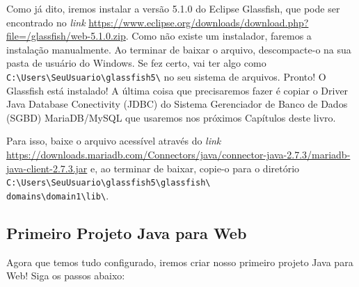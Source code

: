 Como já dito, iremos instalar a versão 5.1.0 do Eclipse Glassfish, que pode ser encontrado no \textit{link} 
\url{https://www.eclipse.org/downloads/download.php?file=/glassfish/web-5.1.0.zip}. Como não existe um instalador, faremos a instalação manualmente. Ao terminar de baixar o arquivo, descompacte-o na sua pasta de usuário do Windows. Se fez certo, vai ter algo como \texttt{C:\textbackslash Users\textbackslash SeuUsuario\textbackslash glassfish5\textbackslash} no seu sistema de arquivos. Pronto! O Glassfish está instalado! A última coisa que precisaremos fazer é copiar o Driver Java Database Conectivity (JDBC) do Sistema Gerenciador de Banco de Dados (SGBD) MariaDB/MySQL que usaremos nos próximos Capítulos deste livro.

Para isso, baixe o arquivo acessível através do \textit{link} \url{https://downloads.mariadb.com/Connectors/java/connector-java-2.7.3/mariadb-java-client-2.7.3.jar} e, ao terminar de baixar, copie-o para o diretório \texttt{C:\textbackslash Users\textbackslash SeuUsuario\textbackslash glassfish5\textbackslash glassfish\textbackslash\\domains\textbackslash domain1\textbackslash lib\textbackslash}.




\subsection{Primeiro Projeto Java para Web}

Agora que temos tudo configurado, iremos criar nosso primeiro projeto Java para Web! Siga os passos abaixo:

